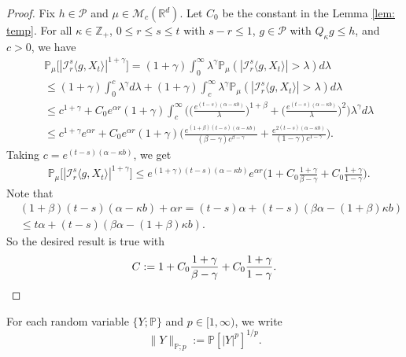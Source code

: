\documentclass[12pt,a4paper]{amsart}
\theoremstyle{plain}
\theoremstyle{definition}
\numberwithin{equation}{section}
\begin{document}
\begin{proof}
    Fix $h \in \mathcal P$ and $\mu \in \mathcal M_c(\mathbb R^d)$. Let $C_0$ be the constant in the Lemma \ref{lem: temp}.
    For all $\kappa \in \mathbb Z_+$,  $0\leq r\leq s\leq t$ with $s-r \leq 1$,  $g\in \mathcal P$ with $Q_{\kappa} g \leq h$, and $c>0$, we have
\begin{align}
    &\mathbb P_\mu\big[|\mathcal I_r^s\langle g, X_t\rangle|^{1+\gamma}\big]
    = (1+\gamma)\int_0^\infty \lambda^{\gamma} \mathbb P_{\mu}(|\mathcal I_r^s\langle g, X_t\rangle|>\lambda) d\lambda
    \\&\leq (1+\gamma)\int_0^c \lambda^{\gamma} d\lambda +(1+\gamma)\int_c^\infty \lambda^{\gamma}\mathbb P_\mu(|\mathcal I_r^s\langle g, X_t\rangle|> \lambda) d\lambda
    \\& \leq c^{1+\gamma} + C_0  e^{\alpha r}(1+\gamma)\int_c^\infty \bigg(\Big(\frac{e^{(t-s)(\alpha - \kappa b)}}{\lambda}\Big)^{1+\beta}+\Big(\frac{e^{(t-s)(\alpha - \kappa b)}}{\lambda}\Big)^{2}\bigg)\lambda^{\gamma}d\lambda
    \\&\leq c^{1+\gamma} e^{\alpha r} + C_0e^{\alpha r}(1+\gamma)\Big(  \frac{e^{(1+\beta)(t-s)(\alpha- \kappa b)}}{(\beta - \gamma)c^{\beta - \gamma}}  + \frac{e^{2(t-s)(\alpha- \kappa b)}}{(1 - \gamma)c^{1 - \gamma}} \Big).
\end{align}
    Taking $c = e^{(t-s)(\alpha- \kappa b)}$, we get
\begin{align}
    &\mathbb P_\mu\big[|\mathcal I_r^s\langle g, X_t\rangle|^{1+\gamma}\big]
    \leq e^{(1+\gamma)(t-s)(\alpha- \kappa b)} e^{\alpha r}\Big(1+ C_0 \frac{1+\gamma}{\beta - \gamma}+ C_0 \frac{1+\gamma}{1 - \gamma}\Big).
\end{align}
    Note that
\begin{align}
    &(1+\beta)(t-s)(\alpha- \kappa b) + \alpha r
    = (t-s)\alpha+(t-s) (\beta\alpha- (1+\beta)\kappa b)
    \\&\leq t\alpha+(t-s) (\beta\alpha- (1+\beta)\kappa b).
\end{align}
    So the desired result is true with
\[
    C
    := 1+ C_0 \frac{1+\gamma}{\beta - \gamma}+ C_0 \frac{1+\gamma}{1 - \gamma}.
    \qedhere
\]
\end{proof}
    For each random variable $\{Y; \mathbb P\}$ and $p \in [1,\infty)$, we write
\[
    \|Y\|_{\mathbb P;p}:= \mathbb P[|Y|^p]^{1/p}.
\]
\end{document}
